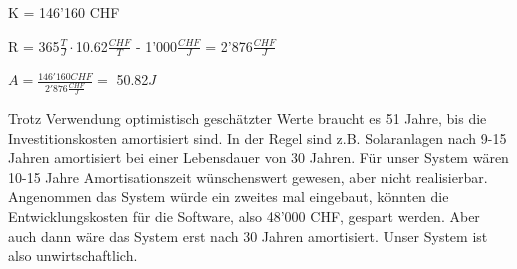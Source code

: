 \bigskip
K = 146'160 CHF

\bigskip
R = 365$\tfrac{T}{J}\cdot$10.62$\tfrac{CHF}{T}$ - 1'000$\tfrac{CHF}{J}$ = 2'876$\tfrac{CHF}{J}$

\bigskip
$A = \tfrac{146'160CHF}{2'876 \tfrac{CHF}{J}} =$ 50.82$J$

Trotz Verwendung optimistisch geschätzter Werte braucht es 51 Jahre, bis die Investitionskosten amortisiert sind. In der Regel sind z.B. Solaranlagen nach 9-15 Jahren amortisiert bei einer Lebensdauer von 30 Jahren. Für unser System wären 10-15 Jahre Amortisationszeit wünschenswert gewesen, aber nicht realisierbar.
Angenommen das System würde ein zweites mal eingebaut, könnten die Entwicklungskosten für die Software, also 48'000 CHF, gespart werden. Aber auch dann wäre das System erst nach 30 Jahren amortisiert. Unser System ist also unwirtschaftlich.